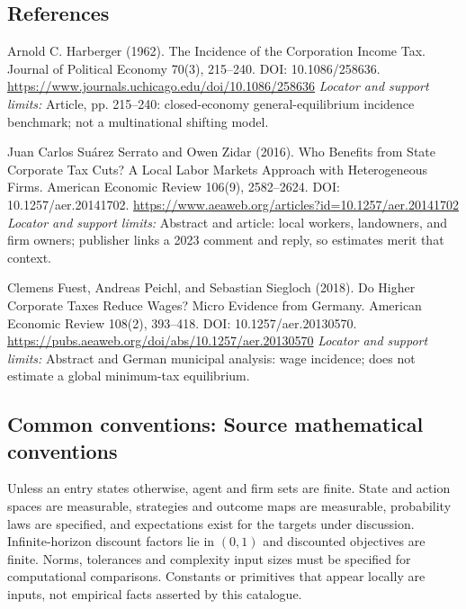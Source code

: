 \documentclass[11pt,a4paper]{article}
\begin{document}
\subsection*{References}
\begin{enumerate}[label={[S\arabic*]},leftmargin=*,itemsep=0.6em]
\item Arnold C. Harberger (1962). The Incidence of the Corporation Income Tax. Journal of Political Economy 70(3), 215--240. DOI: 10.1086/258636.
\url{https://www.journals.uchicago.edu/doi/10.1086/258636}
\newline\emph{Locator and support limits:} Article, pp. 215--240: closed-economy general-equilibrium incidence benchmark; not a multinational shifting model.
\item Juan Carlos Suárez Serrato and Owen Zidar (2016). Who Benefits from State Corporate Tax Cuts? A Local Labor Markets Approach with Heterogeneous Firms. American Economic Review 106(9), 2582--2624. DOI: 10.1257/aer.20141702.
\url{https://www.aeaweb.org/articles?id=10.1257/aer.20141702}
\newline\emph{Locator and support limits:} Abstract and article: local workers, landowners, and firm owners; publisher links a 2023 comment and reply, so estimates merit that context.
\item Clemens Fuest, Andreas Peichl, and Sebastian Siegloch (2018). Do Higher Corporate Taxes Reduce Wages? Micro Evidence from Germany. American Economic Review 108(2), 393--418. DOI: 10.1257/aer.20130570.
\url{https://pubs.aeaweb.org/doi/abs/10.1257/aer.20130570}
\newline\emph{Locator and support limits:} Abstract and German municipal analysis: wage incidence; does not estimate a global minimum-tax equilibrium.
\end{enumerate}

\subsection*{Common conventions: Source mathematical conventions}

Unless an entry states otherwise, agent and firm sets are finite. State and action spaces are measurable, strategies and outcome maps are measurable, probability laws are specified, and expectations exist for the targets under discussion. Infinite-horizon discount factors lie in $(0,1)$ and discounted objectives are finite. Norms, tolerances and complexity input sizes must be specified for computational comparisons. Constants or primitives that appear locally are inputs, not empirical facts asserted by this catalogue.
\end{document}
